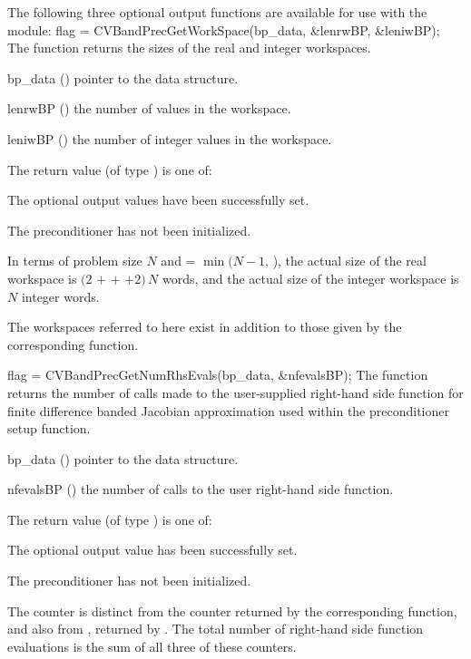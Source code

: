 \noindent The following three optional output functions are available for use with 
the {\cvbandpre} module:
{
  flag = CVBandPrecGetWorkSpace(bp\_data, \&lenrwBP, \&leniwBP);
}
{
  The function  returns the sizes of
  the {\cvbandpre} real and integer workspaces.
}
{
  \begin{args}[lenrwBP]
  \item[bp\_data] ()
    pointer to the {\cvbandpre} data structure.
  \item[lenrwBP] ()
    the number of  values in the {\cvbandpre} workspace.
  \item[leniwBP] ()
    the number of integer values in the {\cvbandpre} workspace.
  \end{args}
}
{
  The return value  (of type ) is one of:
  \begin{args}
  \item[\Id{CVBANDPRE\_SUCCESS}] 
    The optional output values have been successfully set.
  \item[\Id{CVBANDPRE\_PDATA\_NULL}]
    The {\cvbandpre} preconditioner has not been initialized.
  \end{args}
}
{
  In terms of problem size $N$ and  = $\min(N-1,\,$),
  the actual size of the real workspace is
  $(2$  $+$  $+$  $+2)\, N$  words,
  and the actual size of the integer workspace is $N$ integer words.

  The workspaces referred to here exist in addition to those given by the
  corresponding  function.
}
{
  flag = CVBandPrecGetNumRhsEvals(bp\_data, \&nfevalsBP);
}
{
  The function  returns the
  number of calls made to the user-supplied right-hand side function for
  finite difference banded Jacobian approximation used within
  the preconditioner setup function.
}
{
  \begin{args}[nfevalsBP]
  \item[bp\_data] ()
    pointer to the {\cvbandpre} data structure.
  \item[nfevalsBP] ()
    the number of calls to the user right-hand side function.
  \end{args}
}
{
  The return value  (of type ) is one of:
  \begin{args}
  \item[\Id{CVBANDPRE\_SUCCESS}] 
    The optional output value has been successfully set.
  \item[\Id{CVBANDPRE\_PDATA\_NULL}]
    The {\cvbandpre} preconditioner has not been initialized.
  \end{args}
}
{
The counter  is distinct from the counter 
returned by the corresponding  function, and
also from , returned by .
The total number of right-hand side function evaluations is the
sum of all three of these counters.
}


